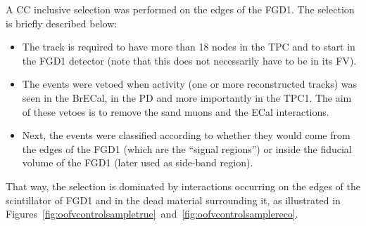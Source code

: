 A \Gls{CC} inclusive selection was performed on the edges of the
\Gls{FGD}1. The selection is briefly described below:

\begin{itemize}[noitemsep,topsep=0pt]
\item The track is required to have more than 18 nodes in the
  \Gls{TPC} and to start in the \Gls{FGD}1 detector (note that this
  does not necessarily have to be in its \Gls{FV}).
\item The events were vetoed when activity (one or more reconstructed
  tracks) was seen in the \Gls{BrECal}, in the \Gls{PD} and more
  importantly in the \Gls{TPC}1. The aim of these vetoes is to remove
  the \gls{sand} muons and the \Gls{ECal} interactions.
\item Next, the events were classified according to whether they would
  come from the edges of the \Gls{FGD}1 (which are the ``signal regions'')
  or inside the fiducial volume of the \Gls{FGD}1 (later used as
  side-band region).
\end{itemize}

That way, the selection is dominated by interactions occurring on the
edges of the scintillator of \Gls{FGD}1 and in the dead material
surrounding it, as illustrated in
Figures~\ref{fig:oofvcontrolsampletrue}~and~\ref{fig:oofvcontrolsamplereco}.


